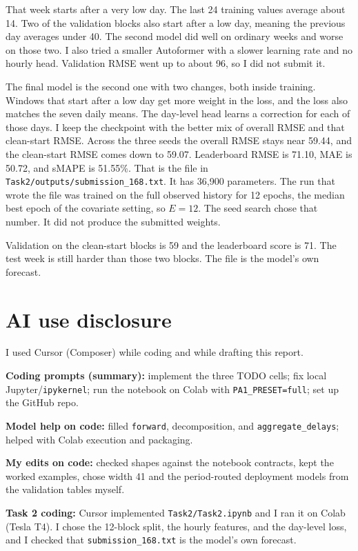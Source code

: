 \documentclass[11pt,a4paper]{article}
\begin{document}
That week starts after a very low day. The last 24 training values average about 14. Two of the validation blocks also start after a low day, meaning the previous day averages under 40. The second model did well on ordinary weeks and worse on those two. I also tried a smaller Autoformer with a slower learning rate and no hourly head. Validation RMSE went up to about 96, so I did not submit it.

The final model is the second one with two changes, both inside training. Windows that start after a low day get more weight in the loss, and the loss also matches the seven daily means. The day-level head learns a correction for each of those days. I keep the checkpoint with the better mix of overall RMSE and that clean-start RMSE. Across the three seeds the overall RMSE stays near 59.44, and the clean-start RMSE comes down to 59.07. Leaderboard RMSE is 71.10, MAE is 50.72, and sMAPE is 51.55\%. That is the file in \texttt{Task2/outputs/submission\_168.txt}. It has 36,900 parameters. The run that wrote the file was trained on the full observed history for 12 epochs, the median best epoch of the covariate setting, so $E=12$. The seed search chose that number. It did not produce the submitted weights.

Validation on the clean-start blocks is 59 and the leaderboard score is 71. The test week is still harder than those two blocks. The file is the model's own forecast.

\section*{AI use disclosure}
I used Cursor (Composer) while coding and while drafting this report.

\noindent\textbf{Coding prompts (summary):} implement the three TODO cells; fix local Jupyter/\texttt{ipykernel}; run the notebook on Colab with \texttt{PA1\_PRESET=full}; set up the GitHub repo.

\noindent\textbf{Model help on code:} filled \texttt{forward}, decomposition, and \texttt{aggregate\_delays}; helped with Colab execution and packaging.

\noindent\textbf{My edits on code:} checked shapes against the notebook contracts, kept the worked examples, chose width 41 and the period-routed deployment models from the validation tables myself.

\noindent\textbf{Task 2 coding:} Cursor implemented \texttt{Task2/Task2.ipynb} and I ran it on Colab (Tesla T4). I chose the 12-block split, the hourly features, and the day-level loss, and I checked that \texttt{submission\_168.txt} is the model's own forecast.
\end{document}
